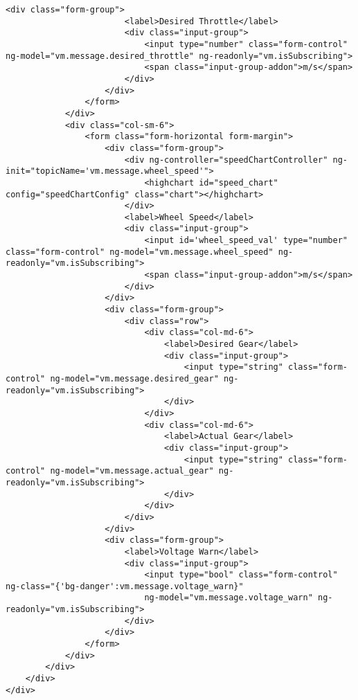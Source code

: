 \begin{lstlisting}[breaklines=true,basicstyle=\tiny]
                    <div class="form-group">
                        <label>Desired Throttle</label>
                        <div class="input-group">
                            <input type="number" class="form-control" ng-model="vm.message.desired_throttle" ng-readonly="vm.isSubscribing">
                            <span class="input-group-addon">m/s</span>
                        </div>
                    </div>
                </form>
            </div>
            <div class="col-sm-6">
                <form class="form-horizontal form-margin">
                    <div class="form-group">
                        <div ng-controller="speedChartController" ng-init="topicName='vm.message.wheel_speed'">
                            <highchart id="speed_chart" config="speedChartConfig" class="chart"></highchart>
                        </div>
                        <label>Wheel Speed</label>
                        <div class="input-group">
                            <input id='wheel_speed_val' type="number" class="form-control" ng-model="vm.message.wheel_speed" ng-readonly="vm.isSubscribing">
                            <span class="input-group-addon">m/s</span>
                        </div>
                    </div>
                    <div class="form-group">
                        <div class="row">
                            <div class="col-md-6">
                                <label>Desired Gear</label>
                                <div class="input-group">
                                    <input type="string" class="form-control" ng-model="vm.message.desired_gear" ng-readonly="vm.isSubscribing">
                                </div>
                            </div>
                            <div class="col-md-6">
                                <label>Actual Gear</label>
                                <div class="input-group">
                                    <input type="string" class="form-control" ng-model="vm.message.actual_gear" ng-readonly="vm.isSubscribing">
                                </div>
                            </div>
                        </div>
                    </div>
                    <div class="form-group">
                        <label>Voltage Warn</label>
                        <div class="input-group">
                            <input type="bool" class="form-control" ng-class="{'bg-danger':vm.message.voltage_warn}" 
                            ng-model="vm.message.voltage_warn" ng-readonly="vm.isSubscribing">
                        </div>
                    </div>
                </form>
            </div>
        </div>
    </div>
</div>
\end{lstlisting}

